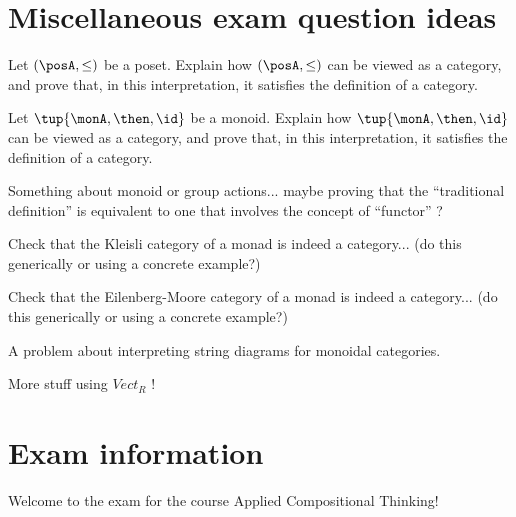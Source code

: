 \documentclass[paper=8.125in:10.250in,pagesize=pdftex,
    headinclude=false,footinclude=false,oneside,egregdoesnotlikesansseriftitles]{kaobook}
\begin{document}
\newpage

\section*{Miscellaneous exam question ideas}

\begin{exercise}
Let $(\posA, \leq)$ be a poset. Explain how $(\posA, \leq)$ can be viewed as a category, and prove that, in this interpretation, it satisfies the definition of a category. 
\end{exercise}


\begin{exercise}
Let $\tup{\monA, \then, \id}$ be a monoid. Explain how $\tup{\monA, \then, \id}$ can be viewed as a category, and prove that, in this interpretation, it satisfies the definition of a category. 
\end{exercise}


\begin{exercise}
Something about monoid or group actions... maybe proving that the ``traditional definition'' is equivalent to one that involves the concept of ``functor'' ?
\end{exercise}


\begin{exercise}
Check that the Kleisli category of a monad is indeed a category... (do this generically or using a concrete example?)
\end{exercise}

\begin{exercise}
Check that the Eilenberg-Moore category of a monad is indeed a category...  (do this generically or using a concrete example?)
\end{exercise}


\begin{exercise}
A problem about interpreting string diagrams for monoidal categories. 
\end{exercise}


\begin{exercise}
More stuff using $Vect_R$ !
\end{exercise}

\newpage


\section*{Exam information}


Welcome to the exam for the course Applied Compositional Thinking! 
\end{document}

